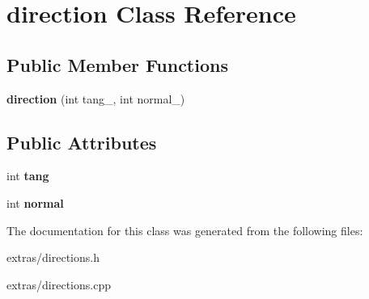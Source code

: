 \hypertarget{classdirection}{\section{direction Class Reference}
\label{classdirection}
}
\subsection*{Public Member Functions}
\begin{DoxyCompactItemize}
\item 
\hypertarget{classdirection_ac4f19ab27f273220e895d14231dad8d1}{{\bfseries direction} (int tang\+\_\+, int normal\+\_\+)}\label{classdirection_ac4f19ab27f273220e895d14231dad8d1}

\end{DoxyCompactItemize}
\subsection*{Public Attributes}
\begin{DoxyCompactItemize}
\item 
\hypertarget{classdirection_a2a197befbcc4b3b96780a9b925b2c382}{int {\bfseries tang}}\label{classdirection_a2a197befbcc4b3b96780a9b925b2c382}

\item 
\hypertarget{classdirection_a5845cd4538ad75d7d860bd658a140c41}{int {\bfseries normal}}\label{classdirection_a5845cd4538ad75d7d860bd658a140c41}

\end{DoxyCompactItemize}


The documentation for this class was generated from the following files\+:\begin{DoxyCompactItemize}
\item 
extras/directions.\+h\item 
extras/directions.\+cpp\end{DoxyCompactItemize}

